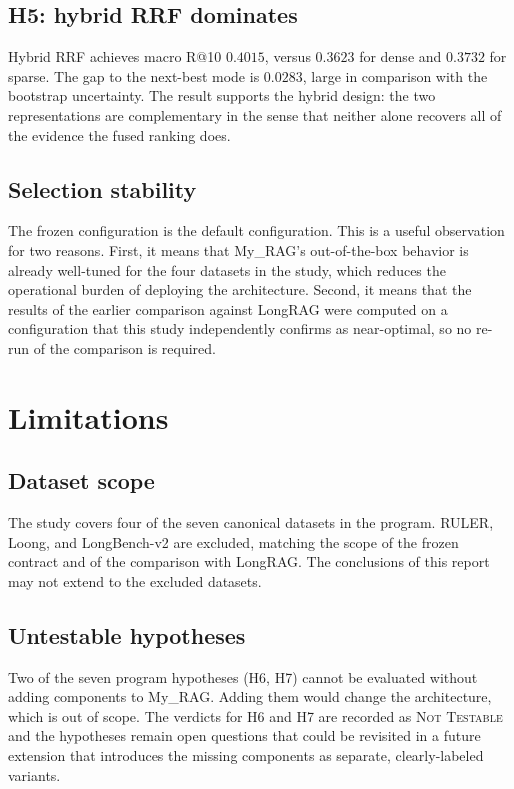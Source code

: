 \documentclass[11pt,a4paper]{article}
\begin{document}
\subsection{H5: hybrid RRF dominates}
Hybrid RRF achieves macro R@10 $\num{0.4015}$, versus
$\num{0.3623}$ for dense and $\num{0.3732}$ for sparse. The gap to
the next-best mode is $\num{0.0283}$, large in comparison with the
bootstrap uncertainty. The result supports the hybrid design: the
two representations are complementary in the sense that neither
alone recovers all of the evidence the fused ranking does.

\subsection{Selection stability}
The frozen configuration is the default configuration. This is a
useful observation for two reasons. First, it means that My\_RAG's
out-of-the-box behavior is already well-tuned for the four datasets
in the study, which reduces the operational burden of deploying the
architecture. Second, it means that the results of the earlier
comparison against LongRAG were computed on a configuration that
this study independently confirms as near-optimal, so no re-run of
the comparison is required.

\section{Limitations}

\subsection{Dataset scope}
The study covers four of the seven canonical datasets in the
program. RULER, Loong, and LongBench-v2 are excluded, matching the
scope of the frozen contract and of the comparison with LongRAG.
The conclusions of this report may not extend to the excluded
datasets.

\subsection{Untestable hypotheses}
Two of the seven program hypotheses (H6, H7) cannot be evaluated
without adding components to My\_RAG. Adding them would change the
architecture, which is out of scope. The verdicts for H6 and H7
are recorded as \textsc{Not Testable} and the hypotheses remain
open questions that could be revisited in a future extension that
introduces the missing components as separate, clearly-labeled
variants.
\end{document}
